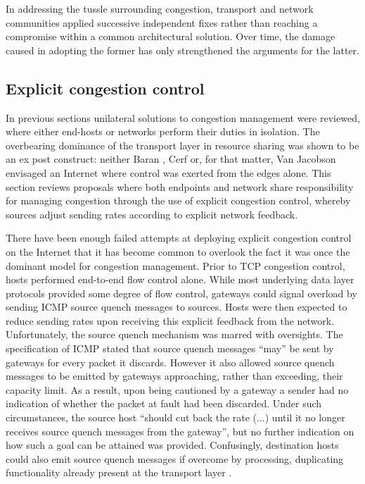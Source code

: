 In addressing the tussle surrounding congestion, transport and network communities applied successive independent fixes rather than reaching a compromise within a common architectural solution.
Over time, the damage caused in adopting the former has only strengthened the arguments for the latter.

\subsection{Explicit congestion control}
\label{sec:resourcepooling:xcc}

In previous sections unilateral solutions to congestion management were reviewed, where either end-hosts or networks perform their duties in isolation. 
The overbearing dominance of the transport layer in resource sharing was shown to be an ex post construct:
neither Baran \cite{Baran:1964p453}, Cerf \cite{Cerf:2005p452} or, for that matter, Van Jacobson \cite{Jacobson:1988p398} envisaged an Internet where control was exerted from the edges alone.
This section reviews proposals where both endpoints and network share responsibility for managing congestion through the use of explicit congestion control, whereby sources adjust sending rates according to explicit network feedback.

There have been enough failed attempts at deploying explicit congestion control on the Internet that it has become common to overlook the fact it was once the dominant model for congestion management.
Prior to TCP congestion control, hosts performed end-to-end flow control alone. 
While most underlying data layer protocols provided some degree of flow control, gateways could signal overload by sending \ac{ICMP} source quench messages to sources.
Hosts were then expected to reduce sending rates upon receiving this explicit feedback from the network.
Unfortunately, the source quench mechanism was marred with oversights.
The specification of ICMP \cite{Postel:1981p463} stated that source quench messages ``may'' be sent by gateways for every packet it discards.
However it also allowed source quench messages to be emitted by gateways approaching, rather than exceeding, their capacity limit.
As a result, upon being cautioned by a gateway a sender had no indication of whether the packet at fault had been discarded.
Under such circumstances, the source host ``should cut back the rate (...) until it no longer receives source quench messages from the gateway'',
but no further indication on how such a goal can be attained was provided.
Confusingly, destination hosts could also emit source quench messages if overcome by processing, duplicating functionality already present at the transport layer \cite{Postel:1980p445}.

